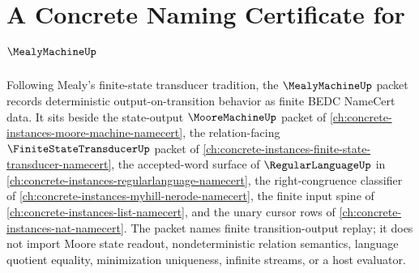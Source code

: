 \chapter{A Concrete Naming Certificate for $\MealyMachineUp$}
\label{ch:concrete-instances-mealy-machine-namecert}

Following Mealy's finite-state transducer tradition, the $\MealyMachineUp$ packet records deterministic output-on-transition behavior as finite BEDC NameCert data. It sits beside the state-output $\MooreMachineUp$ packet of \autoref{ch:concrete-instances-moore-machine-namecert}, the relation-facing $\FiniteStateTransducerUp$ packet of \autoref{ch:concrete-instances-finite-state-transducer-namecert}, the accepted-word surface of $\RegularLanguageUp$ in \autoref{ch:concrete-instances-regularlanguage-namecert}, the right-congruence classifier of \autoref{ch:concrete-instances-myhill-nerode-namecert}, the finite input spine of \autoref{ch:concrete-instances-list-namecert}, and the unary cursor rows of \autoref{ch:concrete-instances-nat-namecert}. The packet names finite transition-output replay; it does not import Moore state readout, nondeterministic relation semantics, language quotient equality, minimization uniqueness, infinite streams, or a host evaluator.

